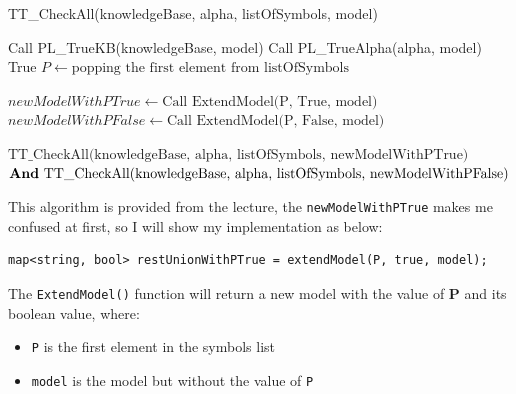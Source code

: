 \documentclass{assignment}
\begin{document}
                                                                                                                                                                                                                                                                                                                                                                                                                                                                                                                                                                                                                                              \begin{algorithm}
\caption{TT\_CheckAll(knowledgeBase, alpha, listOfSymbols, model)}
\small
\begin{algorithmic}[1]
        \State Call PL\_TrueKB(knowledgeBase, model)
            \State Call PL\_TrueAlpha(alpha, model)
        \Else
            \State \Return True
        \EndIf
    \Else
        \State $P \gets \text{popping the first element from listOfSymbols}$
        
        \State $newModelWithPTrue \gets \text{Call ExtendModel(P, True, model)}$
        \State $newModelWithPFalse \gets \text{Call ExtendModel(P, False, model)}$
        
        \State \Return $\text{TT\_CheckAll(knowledgeBase, alpha, listOfSymbols, newModelWithPTrue)}$ \\
        \hspace{\algorithmicindent} $\text{\textbf{And} TT\_CheckAll(knowledgeBase, alpha, listOfSymbols, newModelWithPFalse)}$
    \EndIf
\EndFunction
\end{algorithmic}
\end{algorithm}

This algorithm is provided from the lecture, the \texttt{newModelWithPTrue} makes me confused at first, so I will show my implementation as below:

\lstset{language=C++}
\begin{lstlisting}[caption={Extend model}]
map<string, bool> restUnionWithPTrue = extendModel(P, true, model);
\end{lstlisting}

The \texttt{ExtendModel()} function will return a new model with the value of \textbf{P} and its boolean value, where:
\begin{itemize}
  \item \texttt{P} is the first element in the symbols list
  \item \texttt{model} is the model but without the value of \texttt{P}
\end{itemize}
\end{document}
